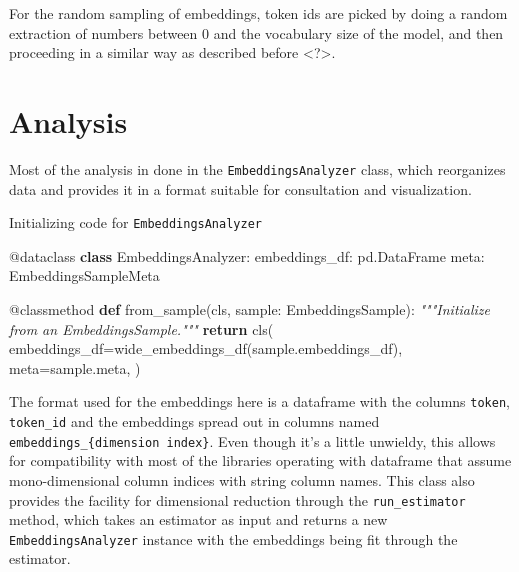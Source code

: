 \documentclass[
  a4paper, twoside, 10pt, titlepage]{book}
\newenvironment{Shaded}{}{}
\newcommand{\AttributeTok}[1]{\textcolor[rgb]{0.49,0.56,0.16}{#1}}
\newcommand{\CommentTok}[1]{\textcolor[rgb]{0.38,0.63,0.69}{\textit{#1}}}
\newcommand{\ControlFlowTok}[1]{\textcolor[rgb]{0.00,0.44,0.13}{\textbf{#1}}}
\newcommand{\KeywordTok}[1]{\textcolor[rgb]{0.00,0.44,0.13}{\textbf{#1}}}
\newcommand{\NormalTok}[1]{#1}
\newcommand{\OperatorTok}[1]{\textcolor[rgb]{0.40,0.40,0.40}{#1}}
\begin{document}
For the random sampling of embeddings, token ids are picked by doing a
random extraction of numbers between 0 and the vocabulary size of the
model, and then proceeding in a similar way as described before
\textless?\textgreater.

\clearpage

\section{Analysis}\label{analysis}

Most of the analysis in done in the \texttt{EmbeddingsAnalyzer} class,
which reorganizes data and provides it in a format suitable for
consultation and visualization.

\begin{codelisting}

\caption{Initializing code for
\texttt{EmbeddingsAnalyzer}}\label{lst:embeddingsanalyzer}

\begin{Shaded}
\begin{Highlighting}[]
\AttributeTok{@dataclass}
\KeywordTok{class}\NormalTok{ EmbeddingsAnalyzer:}
\NormalTok{    embeddings\_df: pd.DataFrame}
\NormalTok{    meta: EmbeddingsSampleMeta}

    \AttributeTok{@classmethod}
    \KeywordTok{def}\NormalTok{ from\_sample(cls, sample: EmbeddingsSample):}
        \CommentTok{"""Initialize from an EmbeddingsSample."""}
        \ControlFlowTok{return}\NormalTok{ cls(}
\NormalTok{            embeddings\_df}\OperatorTok{=}\NormalTok{wide\_embeddings\_df(sample.embeddings\_df),}
\NormalTok{            meta}\OperatorTok{=}\NormalTok{sample.meta,}
\NormalTok{        )}
\end{Highlighting}
\end{Shaded}

\end{codelisting}

The format used for the embeddings here is a dataframe with the columns
\texttt{token}, \texttt{token\_id} and the embeddings spread out in
columns named \texttt{embeddings\_\{dimension\ index\}}. Even though
it's a little unwieldy, this allows for compatibility with most of the
libraries operating with dataframe that assume mono-dimensional column
indices with string column names. This class also provides the facility
for dimensional reduction through the \texttt{run\_estimator} method,
which takes an estimator as input and returns a new
\texttt{EmbeddingsAnalyzer} instance with the embeddings being fit
through the estimator.
\end{document}
